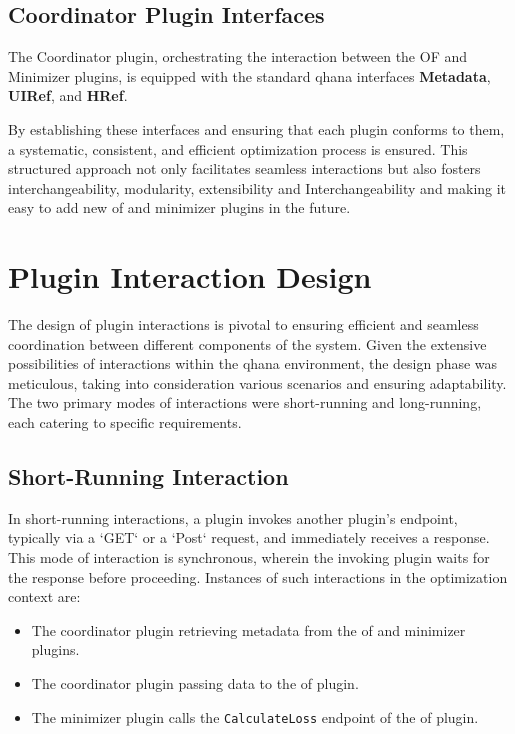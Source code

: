 \documentclass[
  a4paper,  %
  twoside,  %
  bibliography=totoc,
  headsepline,
  cleardoublepage=empty,
  parskip=half,
  draft=false
]{scrbook}
\begin{document}
\subsection{Coordinator Plugin Interfaces}

The Coordinator plugin, orchestrating the interaction between the OF and Minimizer plugins, is equipped with the standard \gls{qhana} interfaces \textbf{Metadata}, \textbf{UIRef}, and \textbf{HRef}.

By establishing these interfaces and ensuring that each plugin conforms to them, a systematic, consistent, and efficient optimization process is ensured.
This structured approach not only facilitates seamless interactions but also fosters interchangeability, modularity, extensibility and Interchangeability and making it easy to add new \gls{of} and minimizer plugins in the future.

\section{Plugin Interaction Design}

The design of plugin interactions is pivotal to ensuring efficient and seamless coordination between different components of the system.
Given the extensive possibilities of interactions within the \gls{qhana} environment, the design phase was meticulous, taking into consideration various scenarios and ensuring adaptability.
The two primary modes of interactions were short-running and long-running, each catering to specific requirements.

\subsection{Short-Running Interaction}

In short-running interactions, a plugin invokes another plugin's endpoint, typically via a `GET` or a `Post` request, and immediately receives a response.
This mode of interaction is synchronous, wherein the invoking plugin waits for the response before proceeding.
Instances of such interactions in the optimization context are:
\begin{itemize}
    \item The coordinator plugin retrieving metadata from the \gls{of} and minimizer plugins.
    \item The coordinator plugin passing data to the \gls{of} plugin.
    \item The minimizer plugin calls the \texttt{CalculateLoss} endpoint of the \gls{of} plugin.
\end{itemize}
\end{document}
